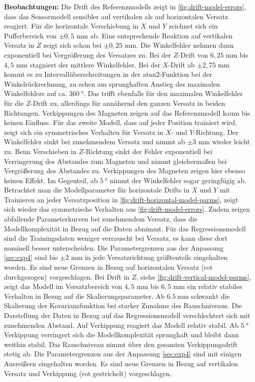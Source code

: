 \textbf{Beobachtungen:} Die Drift des Referenzmodells zeigt in \autoref{fig:drift-model-errors}, dass das Sensormodell sensibler auf vertikalen als auf horizontalen Versatz reagiert. Für die horizontale Verschiebung in $X$ und $Y$ zeichnet sich ein Pufferbereich von $\pm 0,5$ mm ab. Eine entsprechende Reaktion auf vertikalen Versatz in $Z$ zeigt sich schon bei $\pm 0,25$ mm. Die Winkelfehler nehmen dann exponentiell bei Vergrößerung des Versatzes zu. Bei der $Z$-Drift von $6,25$ mm bis $4,5$ mm stagniert der mittlere Winkelfehler. Bei der $X$-Drift ab $\pm 2,75$ mm kommt es zu Intervallüberschreitungen in der $\textrm{atan2}$-Funktion bei der Winkelrückrechnung, zu sehen am sprunghaften Anstieg des maximalen Winkelfehlers auf ca. $\SI{360}{\degree}$. Das trifft ebenfalls für den maximalen Winkelfehler für die $Z$-Drift zu, allerdings für annähernd den ganzen Versatz in beiden Richtungen. Verkippungen des Magneten zeigen auf das Referenzmodell kaum bis keinen Einfluss.
\newline
Für das zweite Modell, dass auf jeder Position trainiert wird, zeigt sich ein symmetrisches Verhalten für Versatz in $X$- und $Y$-Richtung. Der Winkelfehler sinkt bei zunehmendem Versatz und nimmt ab $\pm 3$ mm wieder leicht zu. Beim Verschieben in $Z$-Richtung sinkt der Fehler exponentiell bei Verringerung des Abstandes zum Magneten und nimmt gleichermaßen bei Vergrößerung des Abstandes zu. Verkippungen des Magneten zeigen hier ebenso keinen Effekt. Im Gegenteil, ab $\SI{5}{\degree}$ nimmt der Winkelfehler sogar geringfügig ab.
\newline
Betrachtet man die Modellparameter für horizontale Drifts in $X$ und $Y$ mit Trainieren an jeder Versatzposition in \autoref{fig:drift-horizontal-model-parms}, zeigt sich wieder das symmetrische Verhalten aus \autoref{fig:drift-model-errors}. Zudem zeigen abfallende Parameterkurven bei zunehmendem Versatz, dass die Modellkomplexität in Bezug auf die Daten abnimmt. Für das Regressionsmodell sind die Trainingsdaten weniger verrauscht bei Versatz, es kann diese dort nominell besser unterscheiden. Die Parametergrenzen aus der Anpassung \autoref{sec:exp4} sind bis $\pm 2$ mm in jede Versatzrichtung größtenteils eingehalten worden. Es sind neue Grenzen in Bezug auf horizontalen Versatz (rot durchgezogen) vorgeschlagen.
\newline
Bei Drift in $Z$, siehe \autoref{fig:drift-vertical-model-parms}, zeigt das Modell im Versatzbereich von $4,5$ mm bis $6,5$ mm ein relativ stabiles Verhalten in Bezug auf die Skalierungsparameter. Ab $\SI{6,5}{\milli\metre}$ schwankt die Skalierung der Kovarianzfunktion bei starker Zunahme des Rauschniveaus. Die Darstellung der Daten in Bezug auf das Regressionsmodell verschlechtert sich mit zunehmenden Abstand. Auf Verkippung reagiert das Modell relativ stabil. Ab $\SI{5}{\degree}$ Verkippung verringert sich die Modellkomplexität sprunghaft und bleibt dann weithin stabil. Das Rauschniveau nimmt über den gesamten Verkippungsdrift stetig ab. Die Parametergrenzen aus der Anpassung \autoref{sec:exp4} sind mit einigen Ausreißern eingehalten worden. Es sind neue Grenzen in Bezug auf vertikalen Versatz und Verkippung (rot gestrichelt) vorgeschlagen.


